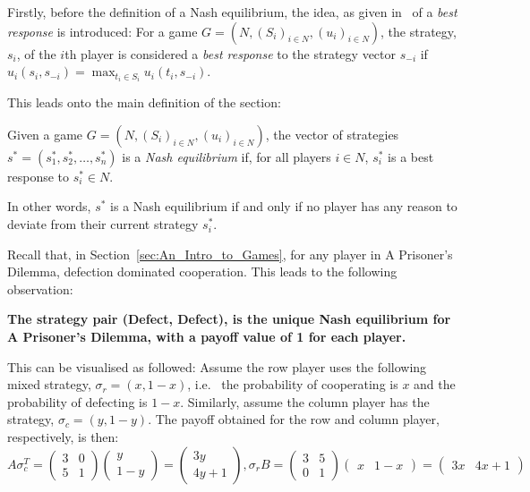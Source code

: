 Firstly, before the definition of a Nash equilibrium, the idea, as given 
in~\cite{maschler_solan_zamir_2013} of a \textit{best response} is introduced:
For a game \(G=(N, (S_{i})_{i \in N}, (u_{i})_{i \in N})\), the strategy,
\(s_{i}\), of the \(i\)th player is considered a \textit{best response} to the
strategy vector \(s_{-i}\) if \(u_{i}(s_{i}, s_{-i}) = \max_{t_{i} \in
S_{i}}u_{i}(t_{i}, s_{-i})\).

This leads onto the main definition of the section:
\begin{definition}\label{def:NE}
    Given a game \(G=(N, (S_{i})_{i \in N}, (u_{i})_{i \in N})\), the vector of
    strategies \(s^{*} = (s_{1}^{*}, s_{2}^{*}, \ldots, s_{n}^{*})\) is a
    \textit{Nash equilibrium} if, for all players \(i \in N\), \(s_{i}^{*}\) is 
    a best response to \(s_{i}^{*} \in N\).~\cite{maschler_solan_zamir_2013}
\end{definition}
In other words, \(s^{*}\) is a Nash equilibrium if and only if no player has any
reason to deviate from their current strategy \(s_{i}^{*}\).

Recall that, in Section~\ref{sec:An_Intro_to_Games}, for any player in A
Prisoner's Dilemma, defection dominated cooperation. This leads to the following
observation:
\begin{center}
    \textbf{The strategy pair (Defect, Defect), is the unique Nash equilibrium 
    for A Prisoner's Dilemma, with a payoff value of 1 for each player.}~\cite{maschler_solan_zamir_2013}
\end{center}
This can be visualised as followed:
Assume the row player uses the following mixed strategy, \(\sigma_{r} = (x,
1-x)\), i.e. \ the probability of cooperating is \(x\) and the probability of
defecting is \(1-x\). Similarly, assume the column player has 
the strategy, \(\sigma_{c} = (y, 1-y)\). The payoff obtained for the row and column player, respectively, is then:
\[
    A\sigma_{c}^T = \begin{pmatrix}
        3 & 0 \\
        5 & 1
    \end{pmatrix} \begin{pmatrix}
        y \\
        1-y
    \end{pmatrix} = \begin{pmatrix}
        3y \\
        4y + 1
    \end{pmatrix},

    \sigma_{r}B = \begin{pmatrix}
        3 & 5 \\
        0 & 1        
    \end{pmatrix} \begin{pmatrix}
        x & 1-x
    \end{pmatrix} = \begin{pmatrix}
        3x & 4x + 1
    \end{pmatrix}
\]

